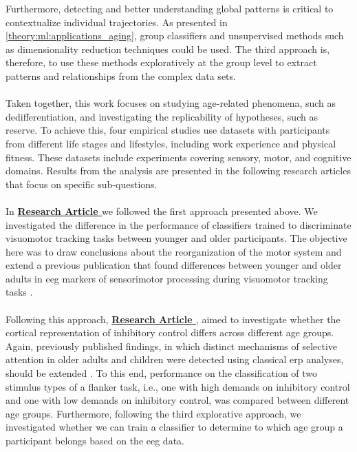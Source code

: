 Furthermore, detecting and better understanding global patterns is critical to contextualize individual trajectories. As presented in \ref{theory:ml:applications_aging}, group classifiers and unsupervised methods such as dimensionality reduction techniques could be used. The third approach is, therefore, to use these methods exploratively at the group level to extract patterns and relationships from the complex data sets.\\
\\
Taken together, this work focuses on studying age-related phenomena, such as dedifferentiation, and investigating the replicability of hypotheses, such as reserve. To achieve this, four empirical studies use datasets with participants from different life stages and lifestyles, including work experience and physical fitness. These datasets include experiments covering sensory, motor, and cognitive domains. Results from the analysis are presented in the following research articles that focus on specific sub-questions.\\
\\
In \textbf{\hyperref[pub:paperI]{Research Article }} we followed the first approach presented above. We investigated the difference in the performance of classifiers trained to discriminate visuomotor tracking tasks between younger and older participants. The objective here was to draw conclusions about the reorganization of the motor system and extend a previous publication that found differences between younger and older adults in \gls{eeg} markers of sensorimotor processing during visuomotor tracking tasks \cite{Vieluf2018}.\\
\\
Following this approach, \textbf{\hyperref[pub:paperII]{Research Article }}, aimed to investigate whether the cortical representation of inhibitory control differs across different age groups. Again, previously published findings, in which distinct mechanisms of selective attention in older adults and children were detected using classical \gls{erp} analyses, should be extended \cite{Reuter2019}. To this end, performance on the classification of two stimulus types of a flanker task, i.e., one with high demands on inhibitory control and one with low demands on inhibitory control, was compared between different age groups. Furthermore, following the third explorative approach, we investigated whether we can train a classifier to determine to which age group a participant belongs based on the \gls{eeg} data.\\
